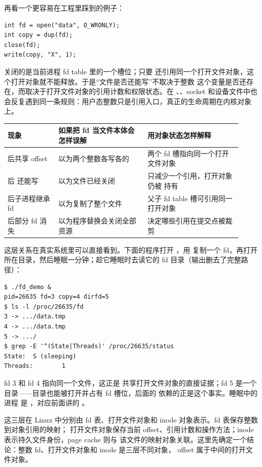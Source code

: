 再看一个更容易在工程里踩到的例子：

\begin{lstlisting}
int fd = open("data", O_WRONLY);
int copy = dup(fd);
close(fd);
write(copy, "X", 1);
\end{lstlisting}

 关闭的是当前进程 fd table 里的一个槽位；只要  还引用同一个打开文件对象，这个打开对象就不能释放。于是“文件是否还能写”不取决于整数  这个变量是否还存在，而取决于打开文件对象的引用计数和权限状态。在 、、socket 和设备文件中也会反复遇到同一条规则：用户态整数只是引用入口，真正的生命周期在内核对象上。

\begin{longtable}{|L{0.2\linewidth}|L{0.35\linewidth}|L{0.37\linewidth}|}
\toprule
现象 & 如果把 fd 当文件本体会怎样误解 & 用对象状态怎样解释 \\
\midrule
{} 后共享 offset & 以为两个整数各写各的 & 两个 fd 槽指向同一个打开文件对象 \\\tablerowrule
{} 后  还能写 & 以为文件已经关闭 & 只减少一个引用，打开对象仍被  持有 \\\tablerowrule
{} 后子进程继承 fd & 以为复制了整个文件 & 父子 fd table 槽可引用同一打开对象 \\\tablerowrule
{} 后部分 fd 消失 & 以为程序替换会关闭全部资源 &  决定哪些引用在提交点被裁剪 \\
\bottomrule
\end{longtable}

这层关系在真实系统里可以直接看到。下面的程序打开 ，用  复制一个 fd，再打开所在目录，然后睡眠一分钟；趁它睡眠时去读它的 fd 目录（输出删去了完整路径）：

\begin{lstlisting}
$ ./fd_demo &
pid=26635 fd=3 copy=4 dirfd=5
$ ls -l /proc/26635/fd
3 -> .../data.tmp
4 -> .../data.tmp
5 -> .../
$ grep -E '^(State|Threads)' /proc/26635/status
State:  S (sleeping)
Threads:        1
\end{lstlisting}

fd 3 和 fd 4 指向同一个文件，这正是  共享打开文件对象的直接证据；fd 5 是一个目录——目录也能被打开并占有 fd 槽位，后面的  依赖的正是这个事实。睡眠中的进程  是 ，对应前面讲的 。

这三层在 Linux 中分别由 fd 表、打开文件对象和 inode 对象表示。fd 表保存整数到对象引用的映射；
打开文件对象保存当前 offset、引用计数和操作方法；inode 表示持久文件身份，page cache 则与
该文件的映射对象关联。这里先确定一个结论：整数 fd、打开文件对象和 inode 是三层不同对象，
offset 属于中间的打开文件对象。

